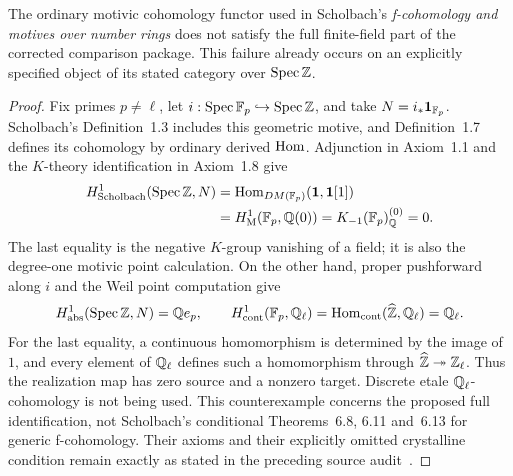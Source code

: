\begin{proposition}
\label{prop:B-Scholbach-finite-support}
The ordinary motivic cohomology functor used in Scholbach's
\emph{f-cohomology and motives over number rings} does not satisfy
the full finite-field part of the corrected comparison package.
This failure already occurs on an explicitly specified object
of its stated category over \(\operatorname{Spec}\mathbb Z\).
\end{proposition}
\begin{proof}
Fix primes \(p\ne\ell\), let
\(i:\operatorname{Spec}\mathbb F_p\hookrightarrow\operatorname{Spec}\mathbb Z\), and take
\(N=i_*\mathbf1_{\mathbb F_p}\).
Scholbach's Definition~1.3 includes this geometric motive, and
Definition~1.7 defines its cohomology by ordinary derived
\(\operatorname{Hom}\).  Adjunction in Axiom~1.1 and the \(K\)-theory
identification in Axiom~1.8 give
\[
 \begin{split}
 H^1_{\rm Scholbach}(\operatorname{Spec}\mathbb Z,N)
 &=\operatorname{Hom}_{DM(\mathbb F_p)}(\mathbf1,\mathbf1[1])\\
 &=H^1_{\mathrm M}(\mathbb F_p,\mathbb Q(0))
   =K_{-1}(\mathbb F_p)^{(0)}_\mathbb Q=0.
 \end{split}
\]
The last equality is the negative \(K\)-group vanishing of a
field; it is also the degree-one motivic point calculation.
On the other hand, proper pushforward along \(i\) and the
Weil point computation give
\[
 H^1_{\rm abs}(\operatorname{Spec}\mathbb Z,N)=\mathbb Q e_p,
 \qquad
 H^1_{\mathrm{cont}}(\mathbb F_p,\mathbb Q_\ell)
   =\operatorname{Hom}_{\mathrm{cont}}(\widehat{\mathbb Z},\mathbb Q_\ell)=\mathbb Q_\ell.
\]
For the last equality, a continuous homomorphism is determined
by the image of \(1\), and every element of \(\mathbb Q_\ell\)
defines such a homomorphism through
\(\widehat{\mathbb Z}\twoheadrightarrow\mathbb Z_\ell\).
Thus the realization map has zero source and a nonzero target.
Discrete etale \(\mathbb Q_\ell\)-cohomology is not being used.
This counterexample concerns the proposed full identification,
not Scholbach's conditional Theorems~6.8, 6.11 and~6.13 for
generic f-cohomology.  Their axioms and their explicitly omitted
crystalline condition remain exactly as stated in the preceding
source audit~\cite[Definitions~1.3, 1.7; Axioms~1.1, 1.8;
Remark~6.2]{BScholbach2015}.
\end{proof}
